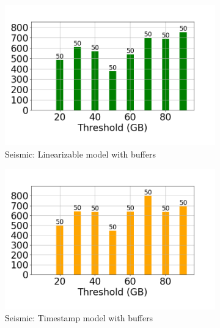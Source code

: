 \begin{figure}
	\centering
	\begin{subfigure}[c]{0.48\textwidth}
		\includegraphics[width=1\textwidth]   {figures/Experiments/Dynamic/SEISMIC/50/average_query_time_per_batch_version_999777015_10485760_10_delay[50].png}
		\caption{Seismic: Linearizable model with buffers}
		\label{fig:logical-ts-50-seismic}
	\end{subfigure}
	\begin{subfigure}[c]{0.48\textwidth}
		\includegraphics[width=1\textwidth]	 {figures/Experiments/Dynamic/SEISMIC/50/average_query_time_per_batch_version_999777018_10485760_10_delay[50].png}
		\caption{Seismic: Timestamp model with buffers}
		\label{fig:system-ts-50-seismic}
	\end{subfigure}
	\begin{subfigure}[c]{0.48\textwidth}

\end{subfigure}
\end{figure}
